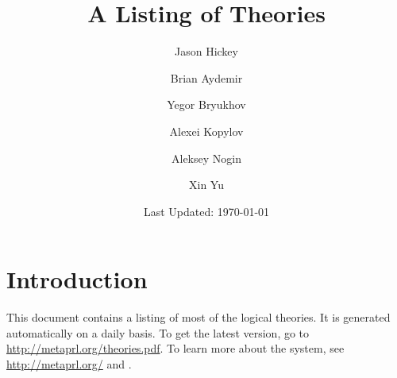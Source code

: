 \documentclass{report}
\begin{document}
\author{Jason Hickey\and Brian Aydemir\and Yegor Bryukhov\and Alexei
Kopylov\and Aleksey Nogin\and Xin Yu}
\title{A Listing of \MetaPRL{} Theories}
\date{Last Updated: \today}
\maketitle
\chapter{Introduction}
This document contains a listing of most of the \MetaPRL{}
logical theories. It is generated automatically on a daily basis. To get the
latest version, go to \url{http://metaprl.org/theories.pdf}. To learn more
about the \MetaPRL{} system, see \url{http://metaprl.org/} and \cite{Hic01}.

\sloppy


\printindex



\end{document}
